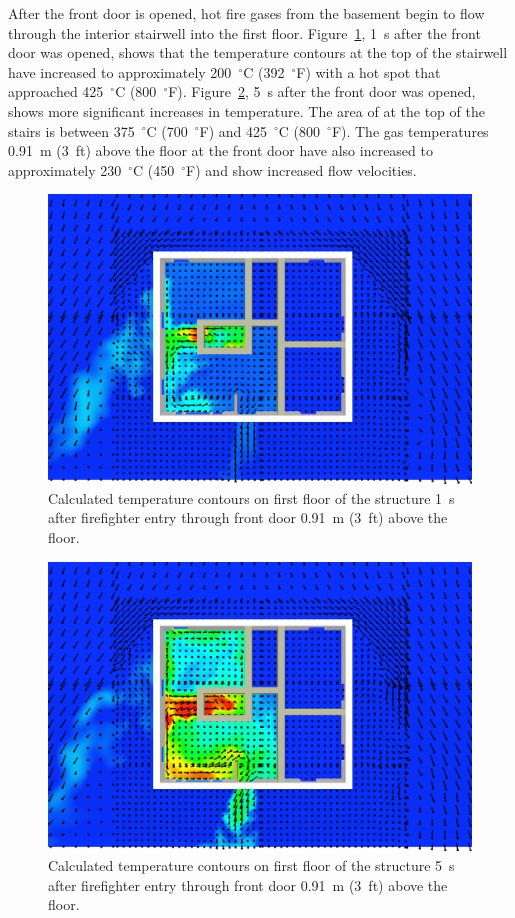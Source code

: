 \documentclass[12pt,oneside]{book}
\begin{document}
After the front door is opened, hot fire gases from the basement begin to flow through the interior stairwell into the first floor. Figure~\ref{fig:temperature_slice_101s}, 1~s after the front door was opened, shows that the temperature contours at the top of the stairwell have increased to approximately 200~$^{\circ}$C (392~$^{\circ}$F) with a hot spot that approached 425~$^{\circ}$C (800~$^{\circ}$F). Figure~\ref{fig:temperature_slice_105s}, 5~s after the front door was opened, shows more significant increases in temperature. The area of at the top of the stairs is between 375~$^{\circ}$C (700~$^{\circ}$F) and 425~$^{\circ}$C (800~$^{\circ}$F). The gas temperatures 0.91~m (3~ft) above the floor at the front door have also increased to approximately 230~$^{\circ}$C (450~$^{\circ}$F) and show increased flow velocities.

\begin{figure}[!ht]
\includegraphics[trim = 1in 1in 1in 1in, clip=true, width=.65\textwidth]{../Figures/temperature_slice_101s}


\caption[Calculated temperature on first floor 1~s after front door opens]
{Calculated temperature contours on first floor of the structure 1~s after firefighter entry through front door 0.91~m (3~ft) above the floor.}
\label{fig:temperature_slice_101s}
\end{figure}

\begin{figure}[!ht]
\includegraphics[trim = 1in 1in 1in 1in, clip=true, width=.65\textwidth]{../Figures/temperature_slice_105s}


\caption[Calculated temperature on first floor 5~s after front door opens]
{Calculated temperature contours on first floor of the structure 5~s after firefighter entry through front door 0.91~m (3~ft) above the floor.}
\label{fig:temperature_slice_105s}
\end{figure}
\end{document}
